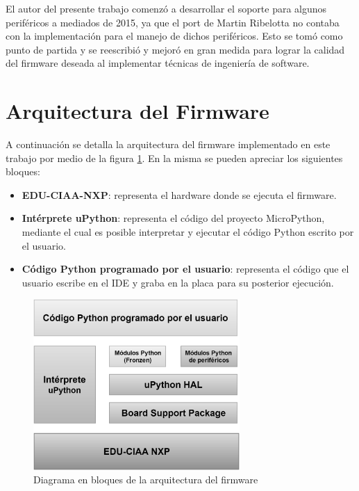 
El autor del presente trabajo comenzó a desarrollar el soporte para algunos periféricos a mediados de 2015, ya que el port de Martin Ribelotta no contaba con la implementación para el manejo de dichos periféricos. Esto se tomó como punto de partida y se reescribió y mejoró en gran medida para lograr la calidad del firmware deseada al implementar técnicas de ingeniería de software.

\section{Arquitectura del Firmware}
\label{sec:firmwareArq}

A continuación se detalla la arquitectura del firmware implementado en este trabajo por medio de la figura \ref{fig:firmwareArq}. En la misma se pueden apreciar los siguientes bloques:

\begin{itemize}
	\item \textbf{EDU-CIAA-NXP}: representa el hardware donde se ejecuta el firmware.
	\item \textbf{Intérprete uPython}: representa el código del proyecto MicroPython, mediante el cual es posible interpretar y ejecutar el código Python escrito por el usuario.
	\item \textbf{Código Python programado por el usuario}: representa el código que el usuario escribe en el IDE y graba en la placa para su posterior ejecución.
\end{itemize}

\begin{figure}[ht]
  \centering
    \includegraphics[width=0.7\textwidth]{Figures/fig_firm_arquitectura}
  \caption{Diagrama en bloques de la arquitectura del firmware}
  \label{fig:firmwareArq}
\end{figure}

